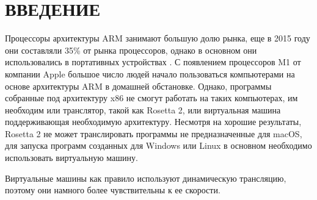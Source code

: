 \section*{ВВЕДЕНИЕ}

Процессоры архитектуры ARM занимают большую долю рынка, еще в 2015 году они составляли 35\% от рынка процессоров, однако в основном они использовались в портативных устройствах \cite{arm_report}.  С появлением процессоров M1 от компании Apple большое число людей начало пользоваться компьютерами на основе архитектуры ARM в домашней обстановке. Однако, программы собранные под архитектуру x86 не смогут работать на таких компьютерах, им необходим или транслятор, такой как Rosetta 2, или виртуальная машина поддерживающая необходимую архитектуру. Несмотря на хорошие результаты, Rosetta 2 не может транслировать программы не предназначенные для macOS, для запуска программ созданных для Windows или Linux в основном необходимо использовать виртуальную машину.

Виртуальные машины как правило используют динамическую трансляцию, поэтому они намного более чувствительны к ее скорости.

\pagebreak